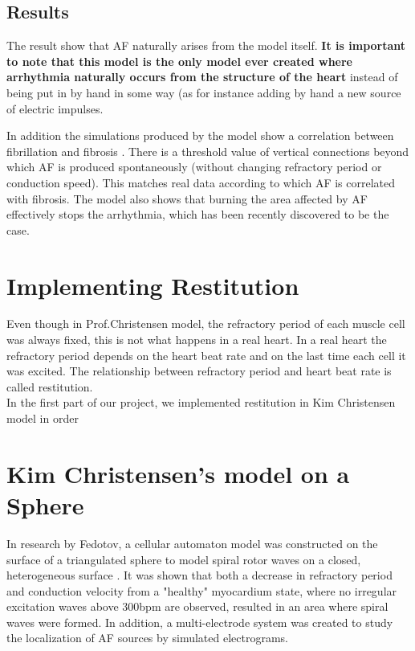 \documentclass[twocolumn, a1paper, 12pt]{article}
\begin{document}
\subsection{Results}

The result show that AF naturally arises from the model itself.
\textbf{ It is important to note that this model is the only model ever created where arrhythmia naturally occurs from the structure of the heart} instead of being put in by hand in some way (as for instance adding by hand a new source of electric impulses. 
 



 In addition the simulations produced by the model show a correlation between fibrillation and fibrosis .
There is a threshold value of vertical connections beyond which AF is produced spontaneously (without changing refractory period or conduction speed). This matches real data according to which AF is correlated with fibrosis. 
The model also shows that burning the area affected by AF effectively stops the arrhythmia, which has been recently discovered to be the case. 








\section{\textbf{Implementing Restitution }} 

Even though in Prof.Christensen model, the refractory period of each muscle cell was always fixed, this is not what happens in a real heart.
In a real heart the refractory period depends on the heart beat rate and on the last time each cell it was excited. The relationship between refractory period and heart beat rate is called restitution.
\\
In the first part of our project, we implemented restitution in Kim Christensen model in order





\section{\textbf{Kim Christensen's model on a Sphere}}



In research by Fedotov, a cellular automaton model was constructed on the surface of a triangulated sphere to model spiral rotor waves on a closed, heterogeneous surface \cite{Fedotov}. It was shown that both a decrease in refractory period and conduction velocity from a "healthy" myocardium state, where no irregular excitation waves above 300bpm are observed, resulted in an area where spiral waves were formed. In addition, a multi-electrode system was created to study the localization of AF sources by simulated electrograms. 
\end{document}

